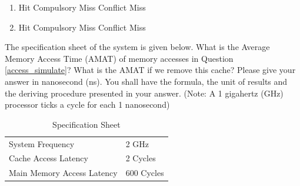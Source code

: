 \begin{questions}
{\begin{solution}
\begin{enumerate}
{\begin{oneparcheckboxes}
                \end{oneparcheckboxes}
            }
            \item 
            {
                \begin{oneparcheckboxes}
                    \choice Hit
                    \choice Compulsory Miss
                    \choice Conflict Miss
                \end{oneparcheckboxes}
            }
            \item 
            {
                \begin{oneparcheckboxes}
                    \choice Hit
                    \choice Compulsory Miss
                    \choice Conflict Miss
                \end{oneparcheckboxes}
            }
        \end{enumerate}
    \end{solution}

}

\newpage

\question[6] 
The specification sheet of the system is given below. What is the
Average Memory Access Time (AMAT) of memory accesses in
Question \ref{access_simulate}?
What is the AMAT if we remove this cache? Please give your answer
in nanosecond (ns). You shall have the formula, the unit of
results and the deriving procedure presented in your answer.
(Note: A 1 gigahertz (GHz) processor ticks a cycle for each 1
nanosecond)

\begin{table}[h]
    \centering
    \begin{tabular}{l l}
        \hline %
        System Frequency           & 2 GHz      \\
        Cache Access Latency       & 2 Cycles   \\
        Main Memory Access Latency & 600 Cycles \\
        \hline %
    \end{tabular}
    \caption{Specification Sheet}
    \label{tab:spec_sheet}
\end{table}

{
    \begin{solution}

        \vspace{2in}
    \end{solution}
}

\end{questions}